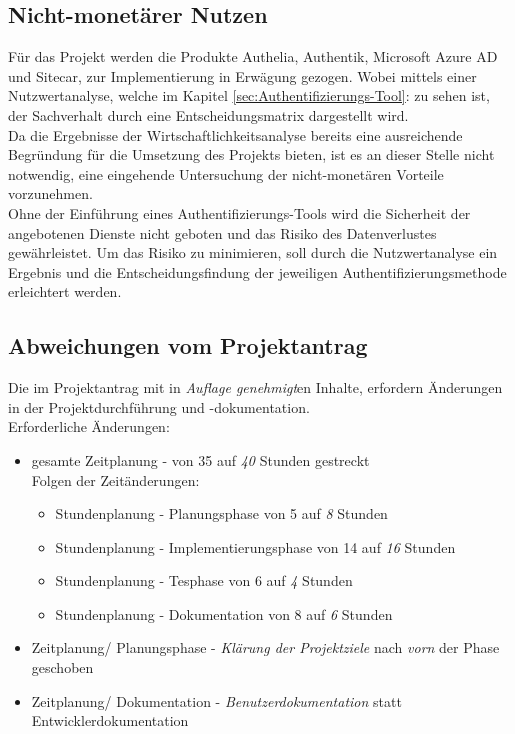 \subsection{Nicht-monetärer Nutzen}
\label{sec:Nicht-monetärer Nutzen}
Für das Projekt werden die Produkte Authelia, Authentik, Microsoft Azure AD und Sitecar, zur Implementierung in Erwägung gezogen. 
Wobei mittels einer Nutzwertanalyse, welche im Kapitel \ref{sec:Authentifizierungs-Tool}:  zu sehen ist, der 
Sachverhalt durch eine Entscheidungsmatrix dargestellt wird.
\\Da die Ergebnisse der Wirtschaftlichkeitsanalyse bereits eine ausreichende Begründung für die Umsetzung des Projekts bieten, 
ist es an dieser Stelle nicht notwendig, eine eingehende Untersuchung der nicht-monetären Vorteile vorzunehmen.
\\Ohne der Einführung eines Authentifizierungs-Tools wird die Sicherheit der angebotenen Dienste nicht geboten und das Risiko des 
Datenverlustes gewährleistet. Um das Risiko zu minimieren, soll durch die Nutzwertanalyse ein Ergebnis und die Entscheidungsfindung 
der jeweiligen Authentifizierungsmethode erleichtert werden.

\subsection{Abweichungen vom Projektantrag}
\label{sec:AbweichungenProjektantrag}
Die im Projektantrag mit in \textit{Auflage genehmigt}en Inhalte, erfordern Änderungen in der 
Projektdurchführung und -dokumentation.
\\Erforderliche Änderungen:
\begin{itemize} [label=--]
	\item gesamte Zeitplanung - von 35 auf \textit{40} Stunden gestreckt
	\\Folgen der Zeitänderungen:
	\begin{itemize}
		\item Stundenplanung - Planungsphase von 5 auf \textit{8} Stunden
		\item Stundenplanung - Implementierungsphase von 14 auf \textit{16} Stunden
		\item Stundenplanung - Tesphase von 6 auf \textit{4} Stunden
		\item Stundenplanung - Dokumentation von 8 auf \textit{6} Stunden 
	\end{itemize}
	\item Zeitplanung/ Planungsphase - \textit{Klärung der Projektziele} nach \textit{vorn} der Phase geschoben
	\item Zeitplanung/ Dokumentation - \textit{Benutzerdokumentation} statt Entwicklerdokumentation
\end{itemize}

